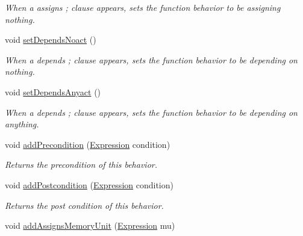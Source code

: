 \begin{DoxyCompactItemize}
\begin{DoxyCompactList}\small\item\em When a {\ttfamily assigns ;} clause appears, sets the function behavior to be assigning nothing. \end{DoxyCompactList}\item 
void \hyperlink{interfaceedu_1_1udel_1_1cis_1_1vsl_1_1civl_1_1model_1_1IF_1_1contract_1_1FunctionBehavior_aa0c08dc66b6b8f11ac04382b84f485e7}{set\+Depends\+Noact} ()
\begin{DoxyCompactList}\small\item\em When a {\ttfamily depends ;} clause appears, sets the function behavior to be depending on nothing. \end{DoxyCompactList}\item 
void \hyperlink{interfaceedu_1_1udel_1_1cis_1_1vsl_1_1civl_1_1model_1_1IF_1_1contract_1_1FunctionBehavior_ac5a37d96ba15dd7ffc6564f5b68bfd04}{set\+Depends\+Anyact} ()
\begin{DoxyCompactList}\small\item\em When a {\ttfamily depends ;} clause appears, sets the function behavior to be depending on anything. \end{DoxyCompactList}\item 
void \hyperlink{interfaceedu_1_1udel_1_1cis_1_1vsl_1_1civl_1_1model_1_1IF_1_1contract_1_1FunctionBehavior_ab33d77a2304ad7306bafdb673d5f8639}{add\+Precondition} (\hyperlink{interfaceedu_1_1udel_1_1cis_1_1vsl_1_1civl_1_1model_1_1IF_1_1expression_1_1Expression}{Expression} condition)
\begin{DoxyCompactList}\small\item\em Returns the precondition of this behavior. \end{DoxyCompactList}\item 
void \hyperlink{interfaceedu_1_1udel_1_1cis_1_1vsl_1_1civl_1_1model_1_1IF_1_1contract_1_1FunctionBehavior_a92c17c20f3a98820f16bcd4217a37e21}{add\+Postcondition} (\hyperlink{interfaceedu_1_1udel_1_1cis_1_1vsl_1_1civl_1_1model_1_1IF_1_1expression_1_1Expression}{Expression} condition)
\begin{DoxyCompactList}\small\item\em Returns the post condition of this behavior. \end{DoxyCompactList}\item 
void \hyperlink{interfaceedu_1_1udel_1_1cis_1_1vsl_1_1civl_1_1model_1_1IF_1_1contract_1_1FunctionBehavior_a797d894a07e6c9a0f9a3d61404d00c6c}{add\+Assigns\+Memory\+Unit} (\hyperlink{interfaceedu_1_1udel_1_1cis_1_1vsl_1_1civl_1_1model_1_1IF_1_1expression_1_1Expression}{Expression} mu)

\end{DoxyCompactItemize}
